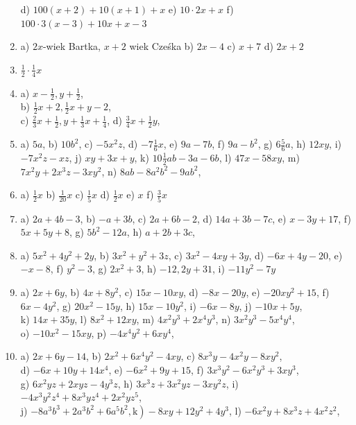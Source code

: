 \documentclass[10pt]{article}
\begin{document}
\begin{enumerate}
d) \(100(x+2)+10(x+1)+x\) e) \(10 \cdot 2 x+x\) f) \(100 \cdot 3(x-3)+10 x+x-3\)
  \item a) \(2 x\)-wiek Bartka, \(x+2\) wiek Cześka b) \(2 x-4\) c) \(x+7\) d) \(2 x+2\)
  \item \(\frac{1}{2} \cdot \frac{1}{4} x\)
  \item a) \(x-\frac{1}{2}, y+\frac{1}{2}\),\\
b) \(\frac{1}{2} x+2, \frac{1}{2} x+y-2\),\\
c) \(\frac{2}{3} x+\frac{1}{2}, y+\frac{1}{3} x+\frac{1}{4}\), d) \(\frac{3}{4} x+\frac{1}{2} y\),
  \item a) \(5 a\), b) \(10 b^{2}\), c) \(-5 x^{2} z\), d) \(-7 \frac{1}{6} x\), e) \(9 a-7 b\), f) \(9 a-b^{2}\), g) \(6 \frac{5}{6} a\), h) \(12 x y\), i) \(-7 x^{2} z-x z\), j) \(x y+3 x+y\), k) \(10 \frac{1}{2} a b-3 a-6 b\), l) \(47 x-58 x y\), m) \(7 x^{2} y+2 x^{3} z-3 x y^{2}\), n) \(8 a b-8 a^{2} b^{2}-9 a b^{2}\),
  \item a) \(\frac{1}{2} x\) b) \(\frac{1}{20} x\) c) \(\frac{1}{5} x\) d) \(\frac{1}{2} x\) e) \(x\) f) \(\frac{3}{5} x\)
  \item a) \(2 a+4 b-3\), b) \(-a+3 b\), c) \(2 a+6 b-2\), d) \(14 a+3 b-7 c\), e) \(x-3 y+17\), f) \(5 x+5 y+8\), g) \(5 b^{2}-12 a\), h) \(a+2 b+3 c\),
  \item a) \(5 x^{2}+4 y^{2}+2 y\), b) \(3 x^{2}+y^{2}+3 z\), c) \(3 x^{2}-4 x y+3 y\), d) \(-6 x+4 y-20\), e) \(-x-8\), f) \(y^{2}-3\), g) \(2 x^{2}+3\), h) \(-12,2 y+31\), i) \(-11 y^{2}-7 y\)
  \item a) \(2 x+6 y\), b) \(4 x+8 y^{2}\), c) \(15 x-10 x y\), d) \(-8 x-20 y\), e) \(-20 x y^{2}+15\), f) \(6 x-4 y^{2}\), g) \(20 x^{2}-15 y\), h) \(15 x-10 y^{2}\), i) \(-6 x-8 y\), j) \(-10 x+5 y\),\\
k) \(14 x+35 y\), l) \(8 x^{2}+12 x y\), m) \(4 x^{2} y^{3}+2 x^{4} y^{3}\), n) \(3 x^{2} y^{3}-5 x^{4} y^{4}\),\\
o) \(-10 x^{2}-15 x y\), p) \(-4 x^{4} y^{2}+6 x y^{4}\),
  \item a) \(2 x+6 y-14\), b) \(2 x^{2}+6 x^{4} y^{2}-4 x y\), c) \(8 x^{3} y-4 x^{2} y-8 x y^{2}\),\\
d) \(-6 x+10 y+14 x^{4}\), e) \(-6 x^{2}+9 y+15\), f) \(3 x^{3} y^{2}-6 x^{2} y^{3}+3 x y^{3}\),\\
g) \(6 x^{2} y z+2 x y z-4 y^{3} z\), h) \(3 x^{3} z+3 x^{2} y z-3 x y^{2} z\), i) \(-4 x^{3} y^{2} z^{4}+8 x^{3} y z^{4}+2 x^{2} y z^{5}\),\\
j) \(\left.-8 a^{3} b^{3}+2 a^{3} b^{2}+6 a^{5} b^{2}, \mathrm{k}\right)-8 x y+12 y^{2}+4 y^{3}\), l) \(-6 x^{2} y+8 x^{3} z+4 x^{2} z^{2}\),\\

\end{enumerate}
\end{document}
